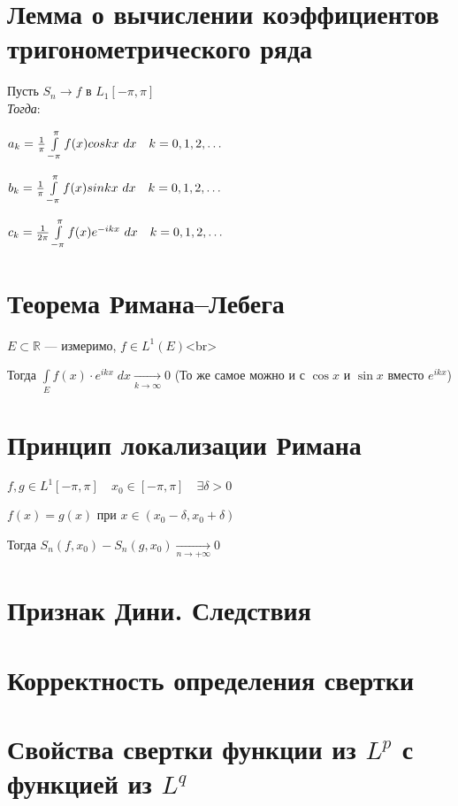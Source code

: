 \documentclass[paper=a4, fontsize=17pt]{article}
\begin{document}
\section{Лемма о вычислении коэффициентов тригонометрического ряда}

Пусть $S_n \rightarrow f$ в $L_1[-\pi, \pi]$\\ 

\emph{Тогда}:

$a_k = \frac{1}{\pi}\int\limits_{-\pi}^{\pi}f(x)coskx\ dx \quad k = 0, 1, 2, \mathellipsis$

$b_k = \frac{1}{\pi}\int\limits_{-\pi}^{\pi}f(x)sinkx\ dx \quad k = 0, 1, 2, \mathellipsis$

$c_k = \frac{1}{2\pi}\int\limits_{-\pi}^{\pi}f(x)e^{-ikx}\ dx \quad k = 0, 1, 2, \mathellipsis$

\section{Теорема Римана--Лебега}

$E \subset \mathbb{R}$ — измеримо, $f \in L^1(E)$<br>

Тогда $\displaystyle\int\limits_E {f(x) \cdot e^{ikx} \; dx} \xrightarrow[k \to \infty]{} 0$ (То же самое можно и с $\cos {x}$ и $\sin {x}$ вместо $e^{ikx}$)

\section{Принцип локализации Римана}

$f, g \in L^1[-\pi, \pi] \quad x_0 \in [-\pi, \pi] \quad \exists \delta > 0$

$f(x) = g(x) $ при $ x \in (x_0 - \delta, x_0 + \delta)$

Тогда $S_n(f, x_0) - S_n(g, x_0) \xrightarrow[n \to +\infty]{} 0$

\section{Признак Дини. Следствия}
\section{Корректность определения свертки}
\section{Свойства свертки функции из $L^p$ с функцией из $L^q$}
\end{document}
